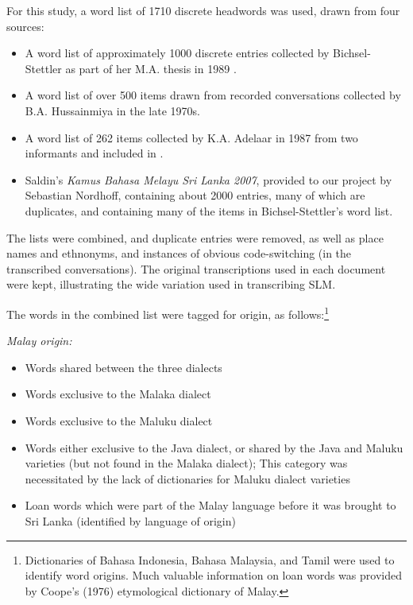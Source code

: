 For this study, a word list of 1710 discrete headwords was used, drawn from four sources:

\begin{itemize}
\item A word list of approximately 1000 discrete entries collected by Bichsel-Stettler as part of her M.A. thesis in 1989 \citep{Bichsel1989}.

\item A word list of over 500 items drawn from recorded conversations collected by B.A. Hussainmiya in the late 1970s.

\item A word list of 262 items collected by K.A. Adelaar in 1987 from two informants and included in \citet{Adelaar1991}.

\item Saldin's \nocite{Saldin2007} \textit{Kamus Bahasa Melayu Sri Lanka 2007}, provided to our project by Sebastian Nordhoff, containing about 2000 entries, many of which are duplicates, and containing many of the items in Bichsel-Stettler's word list.
\end{itemize}

The lists were combined, and duplicate entries were removed, as well as place names and ethnonyms, and instances of obvious code-switching (in the transcribed conversations). The original transcriptions used in each document were kept, illustrating the wide variation used in transcribing SLM.

The words in the combined list were tagged for origin, as follows:\footnote{Dictionaries
 of Bahasa Indonesia, Bahasa Malaysia, and Tamil were used to identify word origins. Much valuable information on loan words was provided by Coope's (1976) \nocite{Coope1976} etymological dictionary of Malay.}

\textit{Malay origin:}
\begin{itemize}
\item Words shared between the three dialects

\item Words exclusive to the Malaka dialect

\item Words exclusive to the Maluku dialect

\item Words either exclusive to the Java dialect, or shared by the Java and Maluku varieties (but not found in the Malaka dialect); This category was necessitated by the lack of dictionaries for Maluku dialect varieties

\item Loan words which were part of the Malay language before it was brought to Sri Lanka (identified by language of origin)

\end{itemize}

